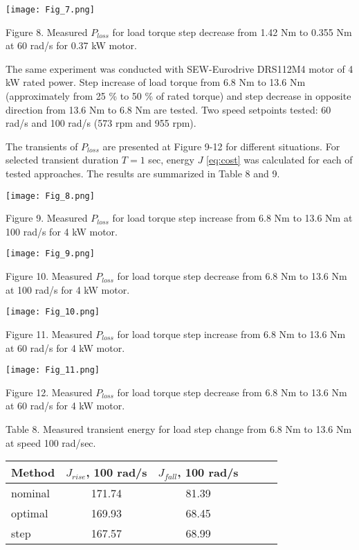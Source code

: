 \documentclass[journal]{IEEEtran}
\begin{document}
\begin{center}
\ifpdf \texttt{[image: Fig\_7.png]}
\fi

Figure 8. Measured $P_{loss}$ for load torque step decrease from 1.42 Nm to 0.355 Nm at 60 rad/s for 0.37 kW motor.
\end{center}

The same experiment was conducted with SEW-Eurodrive DRS112M4 motor of 4 kW rated power. Step increase of load torque from 6.8 Nm to 13.6 Nm (approximately from 25 \% to 50 \% of rated torque) and step decrease in opposite direction from 13.6 Nm to 6.8 Nm are tested. Two speed setpoints tested: 60 rad/s and 100 rad/s (573 rpm and 955 rpm).

The transients of $P_{loss}$ are presented at Figure 9-12 for different situations. For selected transient duration $T = 1$ sec, energy $J$ \eqref{eq:cost} was calculated for each of tested approaches. The results are summarized in Table 8 and 9.

\begin{center}
\ifpdf \texttt{[image: Fig\_8.png]}
\fi

Figure 9. Measured $P_{loss}$ for load torque step increase from 6.8 Nm to 13.6 Nm at 100 rad/s for 4 kW motor.
\end{center}

\begin{center}
\ifpdf \texttt{[image: Fig\_9.png]}
\fi

Figure 10. Measured $P_{loss}$ for load torque step decrease from 6.8 Nm to 13.6 Nm at 100 rad/s for 4 kW motor.
\end{center}

\begin{center}
\ifpdf \texttt{[image: Fig\_10.png]}
\fi

Figure 11. Measured $P_{loss}$ for load torque step increase from 6.8 Nm to 13.6 Nm at 60 rad/s for 4 kW motor.
\end{center}

\begin{center}
\ifpdf \texttt{[image: Fig\_11.png]}
\fi

Figure 12. Measured $P_{loss}$ for load torque step decrease from 6.8 Nm to 13.6 Nm at 60 rad/s for 4 kW motor.
\end{center}

\begin{center}
Table 8.
Measured transient energy for load step change from 6.8 Nm to 13.6 Nm at speed 100 rad/sec.

\begin{tabular}{ | l | c | c | c | c | c | }
\hline 
Method & $J_{rise}$, 100 rad/s & $J_{fall}$, 100 rad/s \\
\hline 
nominal & 171.74  & 81.39   \\
optimal & 169.93  & 68.45  \\
step & 167.57  &  68.99  \\
\hline 
\end{tabular}

\end{center}
\end{document}

